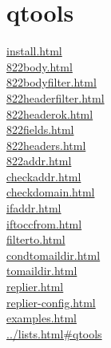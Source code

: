 
\chapter{qtools}

\begin{chapterintro}
\href{How to install qtools}{install.html}\\

\href{The \cmd{822body} program}{822body.html}\\
\href{The \cmd{822bodyfilter} program}{822bodyfilter.html}\\
\href{The \cmd{822headerfilter} program}{822headerfilter.html}\\
\href{The \cmd{822headerok} program}{822headerok.html}\\

\href{The \cmd{822fields} program}{822fields.html}\\
\href{The \cmd{822headers} program}{822headers.html}\\

\href{The \cmd{822addr} program}{822addr.html}\\
\href{The \cmd{checkaddr} program}{checkaddr.html}\\
\href{The \cmd{checkdomain} program}{checkdomain.html}\\
\href{The \cmd{ifaddr} program}{ifaddr.html}\\
\href{The \cmd{iftoccfrom} program}{iftoccfrom.html}\\

\href{The \cmd{filterto} program}{filterto.html}\\

\href{The \cmd{condtomaildir} program}{condtomaildir.html}\\
\href{The \cmd{tomaildir} program}{tomaildir.html}\\

\href{The \cmd{replier} program}{replier.html}\\
\href{The \cmd{replier-config} program}{replier-config.html}\\

\href{Examples}{examples.html}\\

\href{A mailing list for qtools discussion}{../lists.html\#qtools}\\
\end{chapterintro}

